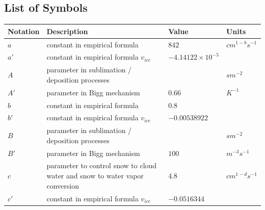 \documentclass[letterpaper,titlepage,10pt]{article}
\numberwithin{equation}{section}
\begin{document}
\begin{appendices}


\section{List of Symbols}

\begin{longtable}{p{}p{}p{}p{}}
	\hline
	\textbf{Notation}  & \textbf{Description}                                                                 & \textbf{Value}             & \textbf{Units} \\
	\hline
	$a$                & constant in empirical formula                                                        & $842$                      & $cm^{1-b} s^{-1}$ \\
	$a'$               & constant in empirical formula $v_{ice}$                                              & $-4.14122 \times 10^{-5}$  & \\
	$A$                & parameter in sublimation / deposition processes                                      &                            & $s m^{-2}$ \\
	$A'$               & parameter in Bigg mechanism                                                          & $0.66$                     & $K^{-1}$ \\
	$b$                & constant in empirical formula                                                        & $0.8$                      & \\
	$b'$               & constant in empirical formula $v_{ice}$                                              & $-0.00538922$              & \\
	$B$                & parameter in sublimation / deposition processes                                      &                            & $s m^{-2}$ \\
	$B'$               & parameter in Bigg mechanism                                                          & $100$                      & $m^{-3} s^{-1}$ \\
	$c$                & parameter to control snow to cloud water and snow to water vapor conversion          & $4.8$                      & $cm^{1-d} s^{-1}$ \\
	$c'$               & constant in empirical formula $v_{ice}$                                              & $-0.0516344$               & \\

\end{longtable}
\end{appendices}
\end{document}
